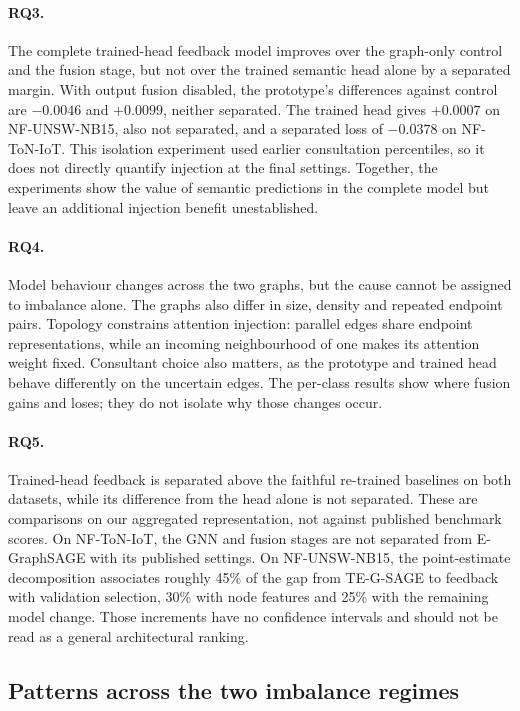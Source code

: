 \paragraph{RQ3.} The complete trained-head feedback model improves over the graph-only control and the fusion stage, but not over the trained semantic head alone by a separated margin. With output fusion disabled, the prototype's differences against control are $-0.0046$ and $+0.0099$, neither separated. The trained head gives $+0.0007$ on NF-UNSW-NB15, also not separated, and a separated loss of $-0.0378$ on NF-ToN-IoT. This isolation experiment used earlier consultation percentiles, so it does not directly quantify injection at the final settings. Together, the experiments show the value of semantic predictions in the complete model but leave an additional injection benefit unestablished.

\paragraph{RQ4.} Model behaviour changes across the two graphs, but the cause cannot be assigned to imbalance alone. The graphs also differ in size, density and repeated endpoint pairs. Topology constrains attention injection: parallel edges share endpoint representations, while an incoming neighbourhood of one makes its attention weight fixed. Consultant choice also matters, as the prototype and trained head behave differently on the uncertain edges. The per-class results show where fusion gains and loses; they do not isolate why those changes occur.

\paragraph{RQ5.} Trained-head feedback is separated above the faithful re-trained baselines on both datasets, while its difference from the head alone is not separated. These are comparisons on our aggregated representation, not against published benchmark scores. On NF-ToN-IoT, the GNN and fusion stages are not separated from E-GraphSAGE with its published settings. On NF-UNSW-NB15, the point-estimate decomposition associates roughly 45\% of the gap from TE-G-SAGE to feedback with validation selection, 30\% with node features and 25\% with the remaining model change. Those increments have no confidence intervals and should not be read as a general architectural ranking.

\subsection{Patterns across the two imbalance regimes}
\label{sec:disc-imbalance}

